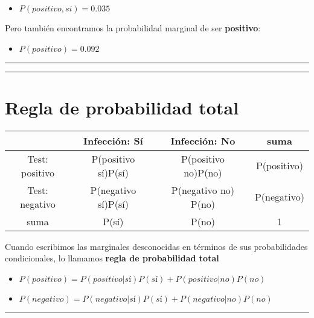 \documentclass[
]{book}
\providecommand{\tightlist}{%
  \setlength{\itemsep}{0pt}\setlength{\parskip}{0pt}}
\begin{document}
\begin{itemize}
\tightlist
\item
  \(P(positivo,si)= 0.035\)
\end{itemize}

Pero también encontramos la probabilidad marginal de ser \textbf{positivo}:

\begin{itemize}
\tightlist
\item
  \(P(positivo)=0.092\)
\end{itemize}

\begin{center}\rule{0.5\linewidth}{0.5pt}\end{center}

\begin{center}\rule{0.5\linewidth}{0.5pt}\end{center}

\hypertarget{regla-de-probabilidad-total}{%
\section{Regla de probabilidad total}\label{regla-de-probabilidad-total}}

\begin{longtable}[]{@{}cccc@{}}
\toprule
& Infección: Sí & Infección: No & suma \\
\midrule
\endhead
Test: positivo & P(positivo {\textbar{}} sí)P(sí) & P(positivo {\textbar{}} no)P(no) & P(positivo) \\
Test: negativo & P(negativo {\textbar{}} sí)P(sí) & P(negativo {\textbar{}} no) P(no) & P(negativo) \\
suma & P(sí) & P(no) & 1 \\
\bottomrule
\end{longtable}

Cuando escribimos las marginales desconocidas en términos de sus probabilidades condicionales, lo llamamos \textbf{regla de probabilidad total}

\begin{itemize}
\tightlist
\item
  \(P(positivo)=P(positivo|sí)P(sí)+P(positivo|no)P(no)\)
\item
  \(P(negativo)=P(negativo|sí)P(sí)+P(negativo|no)P(no)\)
\end{itemize}

\begin{center}\rule{0.5\linewidth}{0.5pt}\end{center}
\end{document}
